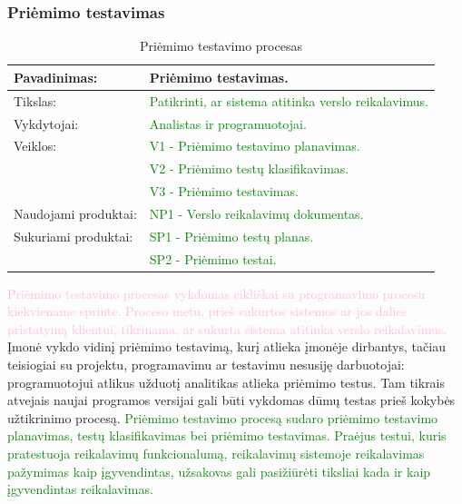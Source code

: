 \documentclass{VUMIFPSkursinis}
\begin{document}
	\subsubsection{Priėmimo testavimas}
	\begin{center}
		\begin{table}[ht]
			\caption{Priėmimo testavimo procesas}
			\begin{tabular}{ | l | l | }
				\hline
				Pavadinimas:         & Priėmimo testavimas.                                               \\ \hline
				Tikslas:             & \textcolor{green}{Patikrinti, ar sistema atitinka verslo reikalavimus.}   \\ \hline
				Vykdytojai:          & \textcolor{green}{Analistas ir programuotojai.}                           \\ \hline
				Veiklos:             & \textcolor{green}{V1 - Priėmimo testavimo planavimas.}                    \\
				                     & \textcolor{green}{V2 - Priėmimo testų klasifikavimas.}             \\
				                     & \textcolor{green}{V3 - Priėmimo testavimas.}                              \\ \hline
				Naudojami produktai: & \textcolor{green}{NP1 - Verslo reikalavimų dokumentas.}                   \\ \hline
				Sukuriami produktai: & \textcolor{green}{SP1 - Priėmimo testų planas.}                    \\
				                     & \textcolor{green}{SP2 - Priėmimo testai.}                          \\ \hline
			\end{tabular}
		\end{table}
	\end{center}
	\textcolor{pink}{Priėmimo testavimo procesas vykdomas cikliškai su programavimo procesu kiekviename sprinte.
	Proceso metu, prieš sukurtos sistemos ar jos dalies pristatymą klientui, tikrinama, ar sukurta sistema atitinka verslo reikalavimus.}
	Įmonė vykdo vidinį priėmimo testavimą, kurį atlieka įmonėje dirbantys, tačiau teisiogiai su projektu, programavimu ar testavimu nesusiję darbuotojai: programuotojui atlikus užduotį analitikas atlieka priėmimo testus.
	Tam tikrais atvejais naujai programos versijai gali būti vykdomas dūmų testas prieš kokybės užtikrinimo procesą.
	\textcolor{green}{Priėmimo testavimo procesą sudaro priėmimo testavimo planavimas, testų klasifikavimas bei priėmimo testavimas.
	Praėjus testui, kuris pratestuoja reikalavimų funkcionalumą, reikalavimų sistemoje reikalavimas pažymimas kaip įgyvendintas, užsakovas gali pasižiūrėti tiksliai kada ir kaip įgyvendintas reikalavimas.}
\end{document}

